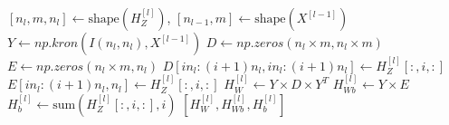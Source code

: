 \documentclass[11pt,twocolumn]{article}
\begin{document}
\begin{algorithm}
\begin{algorithmic}
\EndProcedure
\Statex
{}
	\State $[n_{l},m,n_{l}] \gets \textrm{shape}(H^{[l]}_Z)$, $[n_{l-1},m] \gets \textrm{shape}(X^{[l-1]})$
	\State $Y \gets np.kron(I(n_{l},n_{l}),X^{[l-1]})$
	\State $D \gets np.zeros(n_l \times m, n_l \times m)$
	\State $E \gets np.zeros(n_l \times m, n_l)$	
		\State $D[i n_l:(i+1) n_l, i n_l:(i+1) n_l] \gets H^{[l]}_Z[:,i,:]$
		\State $E[i n_l:(i+1) n_l, n_l] \gets H^{[l]}_Z[:,i,:]$	
	\EndFor
	\State $H^{[l]}_W \gets Y \times D \times Y^T$
	\State $H^{[l]}_{Wb} \gets Y \times E$
	\State $H^{[l]}_{b} \gets \textrm{sum}(H^{[l]}_Z[:,i,:],i)$
	\State \Return $[H^{[l]}_W, H^{[l]}_{Wb}, H^{[l]}_{b} ]$	
\EndProcedure
\end{algorithmic}
\end{algorithm}
\twocolumn
\end{document}
